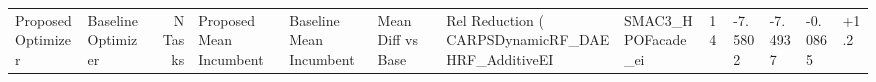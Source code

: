 \begin{tabular}{llrlllllllll}
\toprule
Proposed Optimizer & Baseline Optimizer & N Tasks & Proposed Mean Incumbent & Baseline Mean Incumbent & Mean Diff vs Base & Rel Reduction (%
\midrule
CARPSDynamicRF_DAEHRF_AdditiveEI & SMAC3_HPOFacade_ei & 14 & -7.5802 & -7.4937 & -0.0865 & +1.2%
\bottomrule
\end{tabular}
